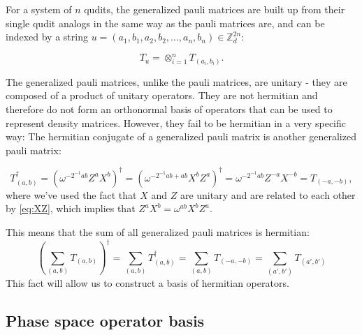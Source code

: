 \documentclass{article}
\begin{document}
For a system of $n$ qudits, the generalized pauli matrices are built up from their single qudit analogs in the same way as the pauli matrices are, and can be indexed by a string $u=(a_1,b_1,a_2,b_2,\ldots,a_n,b_n)\in \mathbb Z_d^{2n}$: 

\begin{equation}T_u=\otimes_{i=1}^n T_{(a_i,b_i)}.\end{equation}

The generalized pauli matrices, unlike the pauli matrices, are unitary - they are composed of a product of unitary operators. They are not hermitian and therefore do not form an orthonormal basis of operators that can be used to represent density matrices. However, they fail to be hermitian in a very specific way: The hermitian conjugate of a generalized pauli matrix is another generalized pauli matrix:

\begin{equation}T_{(a,b)}^\dagger=\left(\omega^{-2^{-1}ab}Z^aX^b\right)^\dagger=\left(\omega^{-2^{-1}ab+ab}X^bZ^a\right)^\dagger=\omega^{-2^{-1}ab}Z^{-a}X^{-b}=T_{(-a,-b)},\end{equation}
where we've used the fact that $X$ and $Z$ are unitary and are related to each other by \eqref{eq:XZ}, which implies that $Z^aX^b=\omega^{ab}X^bZ^a$. 

This means that the sum of all generalized pauli matrices is hermitian:
\begin{equation}\left(\sum_{(a,b)}T_{(a,b)}\right)^\dagger=\sum_{(a,b)}T_{(a,b)}^\dagger=\sum_{(a,b)}T_{(-a,-b)}=\sum_{(a',b')}T_{(a',b')}\end{equation}
This fact will allow us to construct a basis of hermitian operators.

\subsection{Phase space operator basis}

\label{sec:phase_space}
\end{document}
